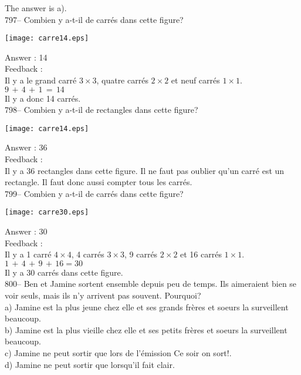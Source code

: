 \documentclass[letterpaper, 12pt]{article}
\begin{document}
The answer is a).\\

797-- Combien y a-t-il de carr\'es dans cette figure?\\
    \begin{center}
    \texttt{[image: carre14.eps]}
    \end{center}


Answer : 14\\

Feedback : \\
Il y a le grand carr\'e $3\times3$, quatre carr\'es $2\times2$ et neuf
carr\'es $1\times1$.\\
$9\,+\,4\,+\,1\,=\,14$\\
Il y a donc 14 carr\'es.\\

798-- Combien y a-t-il de rectangles dans cette figure?\\
    \begin{center}
    \texttt{[image: carre14.eps]}
    \end{center}

Answer : 36\\

Feedback : \\
Il y a 36 rectangles dans cette figure.  Il ne faut pas oublier qu'un
carr\'e est un rectangle.  Il faut donc aussi compter tous les carr\'es.  \\

799-- Combien y a-t-il de carr\'es dans cette figure?\\
    \begin{center}
    \texttt{[image: carre30.eps]}
    \end{center}

Answer : 30\\

Feedback : \\
Il y a 1 carr\'e $4\times4$, 4 carr\'es $3\times3$, 9 carr\'es
$2\times2$ et 16 carr\'es $1\times1$.\\
$1\,+\,4\,+\,9\,+\,16=30$\\
Il y a 30 carr\'es dans cette figure.\\

800-- Ben et Jamine sortent ensemble depuis peu de temps.  Ils aimeraient
bien se voir seuls, mais ils n'y arrivent pas souvent.  Pourquoi?\\
a) Jamine est la plus jeune chez elle et ses grands fr\`eres et soeurs la
surveillent beaucoup.\\
b) Jamine est la plus vieille chez elle et ses petits fr\`eres et soeurs la
surveillent beaucoup.\\
c) Jamine ne peut sortir que lors de l'\'emission \og Ce soir on sort!\fg .\\
d) Jamine ne peut sortir que lorsqu'il fait clair.\\
\end{document}
